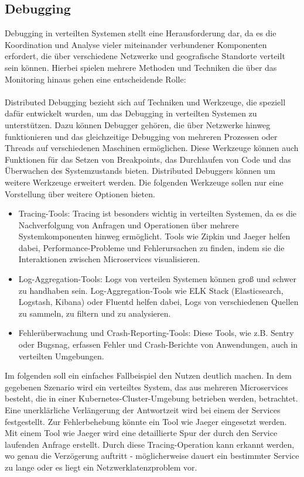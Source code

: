 \subsection{Debugging}

Debugging in verteilten Systemen stellt eine Herausforderung dar, da es die Koordination und Analyse vieler miteinander verbundener Komponenten erfordert, die über verschiedene Netzwerke und geografische Standorte verteilt sein können. Hierbei spielen mehrere Methoden und Techniken die über das Monitoring hinaus gehen eine entscheidende Rolle:
\\\\
Distributed Debugging bezieht sich auf Techniken und Werkzeuge, die speziell dafür entwickelt wurden, um das Debugging in verteilten Systemen zu unterstützen. Dazu können Debugger gehören, die über Netzwerke hinweg funktionieren und das gleichzeitige Debugging von mehreren Prozessen oder Threads auf verschiedenen Maschinen ermöglichen. Diese Werkzeuge können auch Funktionen für das Setzen von Breakpoints, das Durchlaufen von Code und das Überwachen des Systemzustands bieten. Distributed Debuggers können um weitere Werkzeuge erweitert werden. Die folgenden Werkzeuge sollen nur eine Vorstellung über weitere Optionen bieten.
\begin{itemize}
\item Tracing-Tools: Tracing ist besonders wichtig in verteilten Systemen, da es die Nachverfolgung von Anfragen und Operationen über mehrere Systemkomponenten hinweg ermöglicht. Tools wie Zipkin und Jaeger helfen dabei, Performance-Probleme und Fehlerursachen zu finden, indem sie die Interaktionen zwischen Microservices visualisieren.
\item Log-Aggregation-Tools: Logs von verteilen Systemen können groß und schwer zu handhaben sein. Log-Aggregation-Tools wie ELK Stack (Elasticsearch, Logstash, Kibana) oder Fluentd helfen dabei, Logs von verschiedenen Quellen zu sammeln, zu filtern und zu analysieren.
\item Fehlerüberwachung und Crash-Reporting-Tools: Diese Tools, wie z.B. Sentry oder Bugsnag, erfassen Fehler und Crash-Berichte von Anwendungen, auch in verteilten Umgebungen.
\end{itemize}
Im folgenden soll ein einfaches Fallbeispiel den Nutzen deutlich machen. In dem gegebenen Szenario wird ein verteiltes System, das aus mehreren Microservices besteht, die in einer Kubernetes-Cluster-Umgebung betrieben werden, betrachtet. Eine unerklärliche Verlängerung der Antwortzeit wird bei einem der Services festgestellt. Zur Fehlerbehebung könnte ein Tool wie Jaeger eingesetzt werden. Mit einem Tool wie Jaeger wird eine detaillierte Spur der durch den Service laufenden Anfrage erstellt. Durch diese Tracing-Operation kann erkannt werden, wo genau die Verzögerung auftritt - möglicherweise dauert ein bestimmter Service zu lange oder es liegt ein Netzwerklatenzproblem vor.
